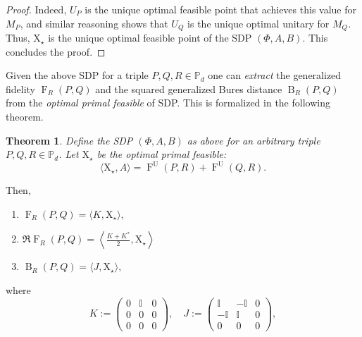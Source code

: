 \documentclass[12pt]{article}
\newtheorem{theorem}{Theorem}[section] %
\theoremstyle{definition}
\newcommand{\Fu}[2]{\operatorname{F}^\mathrm{U}\!\left(#1, #2\right)}
\begin{document}
\begin{proof}
Indeed, $U_P$ is the unique optimal feasible point that achieves this value for $M_P$, and similar reasoning shows that $U_Q$ is the unique optimal unitary for $M_Q$. Thus, $\mathrm{X}_\star$ is the unique optimal feasible point of the SDP $(\Phi,A,B)$. This concludes the proof.
\end{proof}

Given the above SDP for a triple $P,Q,R \in \mathbb P_d$ one can \textit{extract} the generalized fidelity $\operatorname{F}_R(P,Q) $ and the squared generalized Bures distance $\operatorname{B}_R(P,Q)$ from the \textit{optimal primal feasible} of SDP. This is formalized in the following theorem.

\begin{theorembox}
\begin{theorem}
    Define the SDP $(\Phi, A, B)$ as above for an arbitrary triple $P,Q,R \in \mathbb P_d$. Let $\mathrm{X}_\star$ be the optimal primal feasible:
    \begin{equation}
        \langle \mathrm{X_\star}, A \rangle = \Fu{P}{R} + \Fu{Q}{R}.
    \end{equation}
\end{theorem}
Then,
\begin{enumerate}
    \item $\operatorname{F}_R(P,Q) = \langle K, \mathrm{X}_\star \rangle, $
    \item $\Re \operatorname{F}_R(P,Q) = \left\langle \frac{K + K^*}2, \mathrm{X}_\star \right\rangle $
    \item $\operatorname{B}_R(P,Q) = \langle J, \mathrm{X}_\star \rangle, $
\end{enumerate}
where
\begin{equation} \label{Eqn:KandJ}
K :=  \begin{pmatrix}
0 & \mathbb I & 0 \\
0 & 0 & 0 \\
0 & 0 & 0
\end{pmatrix}, \quad J := \begin{pmatrix}
\mathbb I & -\mathbb I & 0 \\
-\mathbb I & \mathbb I & 0 \\
0 & 0 & 0
\end{pmatrix},
\end{equation}

\end{theorembox}
\end{document}

